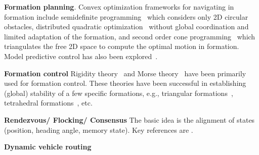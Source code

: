 \textbf{Formation planning}.
Convex optimization frameworks for navigating in formation include semidefinite programming~\cite{Derenick:2010cc} which considers only 2D circular obstacles, distributed quadratic optimization~\cite{AlonsoMora:2015wi} without global coordination and limited adaptation of the formation,
and second order cone programming~\cite{Derenick:ha} which triangulates the free 2D space to compute the optimal motion in formation. Model predictive control has also been explored~\cite{Dunbar:2002fh}.

\textbf{Formation control} Rigidity theory~\cite{Eren.Belhumeur.ea:02} and Morse theory~\cite{Anderson:11} have been primarily used for formation control. These theories have been successful in establishing (global) stability of a few specific formations, e.g., triangular formations~\cite{Cao.Morse.ea:11}, tetrahedral formations~\cite{Anderson.Yu.ea:10}, etc.

\textbf{Rendezvous/ Flocking/ Consensus} The basic idea is the alignment of states (position, heading angle, memory state). Key references are \cite{Cortes.Martinez.ea:06,Jadbabaie.Lin.ea:03}.

\textbf{Dynamic vehicle routing} \cite{Bullo.Frazzoli.ea:PIEEE10}
